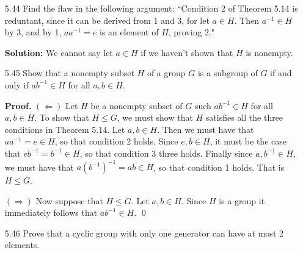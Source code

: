 \begin{enumerate}
      \textbf{Proof.} Let $H$ and $K$ be subgroups of an abelian group $G$, and
      let
      $$J = \{hk : h \in H  \text{ and } k \in K\}.$$
      We want to show that $J \le G$. It is clear $J$ is nonempty because it
      contains $e$. So let $j_1$ and $j_2$ be members of $J$. To complete the
      proof we must show that $j_1j_2^{-1} \in J$. By the definition of $J$, 
      there exist $h_1, h_2 \in H$ and $k_1, k_2 \in K$ such that $j_1 = h_1k_1$
      and $j_2 = h_2k_2$. It follows that
      \begin{align*}
         j_1j_2^{-1} &= h_1k_1(h_2k_2)^{-1} \\
                    &= h_1k_1k_2^{-1}h_2^{-1} \\
                    &= (h_1h_2^{-1})(k_1k_2^{-1}). &[G\text{ is abelian}]
      \end{align*}

      The preceding calculations show that $j_1j_2^{-1} \in J$, so that $J$ is
      a subgroup of $G$. \qed
   \item[5.44] Find the flaw in the following argument: ``Condition 2 of Theorem
               5.14 is reduntant, since it can be derived from 1 and 3, for let
               $a \in H$. Then $a^{-1} \in H$ by 3, and by 1, $aa^{-1} = e$ is 
               an element of $H$, proving 2."

      \textbf{Solution:} We cannot say let $a \in H$ if we haven't shown that
      $H$ is nonempty.
   \item[5.45] Show that a nonempty subset $H$ of a group $G$ is a subgroup of
               $G$ if and only if $ab^{-1} \in H$ for all $a, b \in H$.

      \textbf{Proof.} $(\Leftarrow)$ Let $H$ be a nonempty subset of $G$ such
      $ab^{-1} \in H$ for all $a, b \in H$. To show that $H \le G$, we must
      show that $H$ satisfies all the three conditions in Theorem 5.14. Let
      $a, b \in H$. Then we must have that  $aa^{-1} = e \in H$, so that 
      condition 2 holds. Since $e, b \in H$, it must be the case that
      $eb^{-1} = b^{-1} \in H$, so that condition 3 three holds. Finally since
      $a, b^{-1} \in H$, we must have that $a(b^{-1})^{-1} = ab \in H$, so that
      condition 1 holds. That is $H \le G$.

      $(\Rightarrow)$ Now suppose that $H \le G$. Let $a, b \in H$. Since $H$ is
      a group it immediately follows that $ab^{-1} \in H$. \qed
   \item[5.46] Prove that a cyclic group with only one generator can have at
               most 2 elements.


\end{enumerate}
